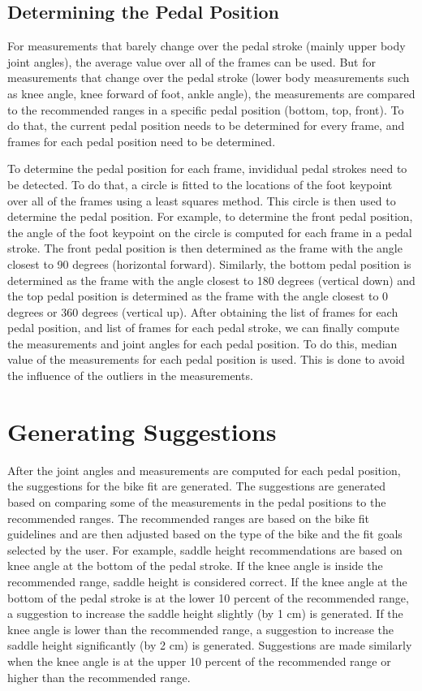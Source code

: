 \subsection{Determining the Pedal Position}
For measurements that barely change over the pedal stroke (mainly upper body joint angles), the average value over all of the frames can be used. But for measurements that change over the pedal stroke (lower body measurements such as knee angle, knee forward of foot, ankle angle), the measurements are compared to the recommended ranges in a specific pedal position (bottom, top, front). To do that, the current pedal position needs to be determined for every frame, and frames for each pedal position need to be determined.

To determine the pedal position for each frame, invididual pedal strokes need to be detected. To do that, a circle is fitted to the locations of the foot keypoint over all of the frames using a least squares method. This circle is then used to determine the pedal position. For example, to determine the front pedal position, the angle of the foot keypoint on the circle is computed for each frame in a pedal stroke. The front pedal position is then determined as the frame with the angle closest to 90 degrees (horizontal forward). Similarly, the bottom pedal position is determined as the frame with the angle closest to 180 degrees (vertical down) and the top pedal position is determined as the frame with the angle closest to 0 degrees or 360 degrees (vertical up). After obtaining the list of frames for each pedal position, and list of frames for each pedal stroke, we can finally compute the measurements and joint angles for each pedal position. To do this, median value of the measurements for each pedal position is used. This is done to avoid the influence of the outliers in the measurements.


\section{Generating Suggestions}
\label{generating_suggestions}
After the joint angles and measurements are computed for each pedal position, the suggestions for the bike fit are generated. The suggestions are generated based on comparing some of the measurements in the pedal positions to the recommended ranges. The recommended ranges are based on the bike fit guidelines and are then adjusted based on the type of the bike and the fit goals selected by the user. For example, saddle height recommendations are based on knee angle at the bottom of the pedal stroke. If the knee angle is inside the recommended range, saddle height is considered correct. If the knee angle at the bottom of the pedal stroke is at the lower 10 percent of the recommended range, a suggestion to increase the saddle height slightly (by 1 cm) is generated. If the knee angle is lower than the recommended range, a suggestion to increase the saddle height significantly (by 2 cm) is generated. Suggestions are made similarly when the knee angle is at the upper 10 percent of the recommended range or higher than the recommended range.


